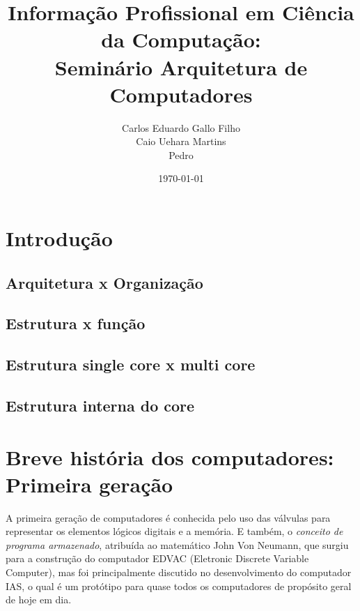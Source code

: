 \documentclass{article}
\title{Informação Profissional em Ciência da Computação:\\
	Seminário Arquitetura de Computadores}
\author{
    Carlos Eduardo Gallo Filho \\
	Caio Uehara Martins \\
	Pedro}
\date{\today}
\begin{document}
\maketitle
\graphicspath{ {./images/} }

\section{Introdução}
\subsection{Arquitetura x Organização}
\subsection{Estrutura x função}
\subsection{Estrutura single core x multi core}
\subsection{Estrutura interna do core}

\section{Breve história dos computadores: Primeira geração}
\begin{flushleft}
    \qquad A primeira geração de computadores é conhecida pelo uso das válvulas para representar os elementos lógicos digitais e a memória. E também, o  \textit{conceito de programa armazenado}, atribuída ao matemático John Von Neumann, que surgiu para a construção do computador EDVAC (Eletronic Discrete Variable Computer), mas foi principalmente discutido no desenvolvimento do computador IAS, o qual é um protótipo para quase todos os computadores de propósito geral de hoje em dia. 
\end{flushleft}
\end{document}
